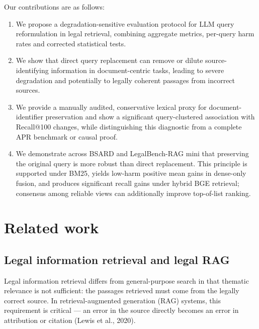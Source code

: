 \documentclass[a4paper,fleqn]{cas-dc}
\begin{document}
Our contributions are as follows:
\begin{enumerate}
    \item We propose a degradation-sensitive evaluation protocol for LLM query reformulation in legal retrieval, combining aggregate metrics, per-query harm rates and corrected statistical tests.
    \item We show that direct query replacement can remove or dilute source-identifying information in document-centric tasks, leading to severe degradation and potentially to legally coherent passages from incorrect sources.
    \item We provide a manually audited, conservative lexical proxy for document-identifier preservation and show a significant query-clustered association with Recall@100 changes, while distinguishing this diagnostic from a complete APR benchmark or causal proof.
    \item We demonstrate across BSARD and LegalBench-RAG mini that preserving the original query is more robust than direct replacement. This principle is supported under BM25, yields low-harm positive mean gains in dense-only fusion, and produces significant recall gains under hybrid BGE retrieval; consensus among reliable views can additionally improve top-of-list ranking.
\end{enumerate}
\section{Related work}

\subsection{Legal information retrieval and legal RAG}

Legal information retrieval differs from general-purpose search
in that thematic relevance is not sufficient: the passages
retrieved must come from the legally correct source. In
retrieval-augmented generation (RAG) systems, this
requirement is critical — an error in the source directly becomes an
error in attribution or citation (Lewis et al., 2020).
\end{document}
